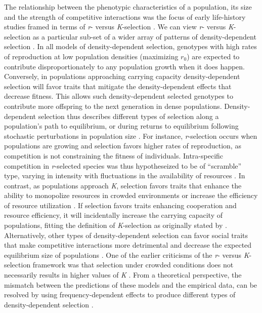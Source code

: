 \documentclass{article}
\begin{document}
 The relationship between the phenotypic characteristics of a population, its size and the strength of competitive interactions was the focus of early life-history studies framed in terms of \textit{r}- versus \textit{K}-selection \citep{macarthur1967theory}. We can view \textit{r}- versus \textit{K}-selection as a particular sub-set of a wider array of patterns of density-dependent selection \citep{Wright2018, Engen2020}. In all models of density-dependent selection, genotypes with high rates of reproduction at low population densities (maximizing $r_0$) are expected to contribute disproportionately to any population growth when it does happen. Conversely, in populations approaching carrying capacity density-dependent selection will favor traits that mitigate the density-dependent effects that decrease fitness. This allows such density-dependent selected genotypes to contribute more offspring to the next generation in dense populations. Density-dependent selection thus describes different types of selection along a population's path to equilibrium, or during returns to equilibrium following stochastic perturbations in population size \citep{Engen2013}. For instance, \textit{r}-selection occurs when populations are growing and selection favors higher rates of reproduction, as competition is not constraining the fitness of individuals. Intra-specific competition in \textit{r}-selected species was thus hypotheseized to be of “scramble” type, varying in intensity with fluctuations in the availability of resources \citep{Southwood1977}. In contrast, as populations approach \textit{K}, selection favors traits that enhance the ability to monopolize resources in crowded environments or increase the efficiency of resource utilization \citep{Boyce1984}. If selection favors traits enhancing cooperation and resource efficiency, it will incidentally increase the carrying capacity of populations, fitting the definition of \textit{K}-selection as originally stated by \cite{macarthur1967theory}. Alternatively, other types of density-dependent selection can favor social traits that make competitive interactions more detrimental and decrease the expected equilibrium size of populations \citep{Joshi2001, Engen2020}. One of the earlier criticisms of the \textit{r}- versus \textit{K}-selection framework was that selection under crowded conditions does not necessarily results in higher values of \textit{K} \citep{Boyce1984}. From a theoretical perspective, the mismatch between the predictions of these models and the empirical data, can be resolved by using frequency-dependent effects to produce different types of density-dependent selection \citep{Engen2020}. 
\end{document}
